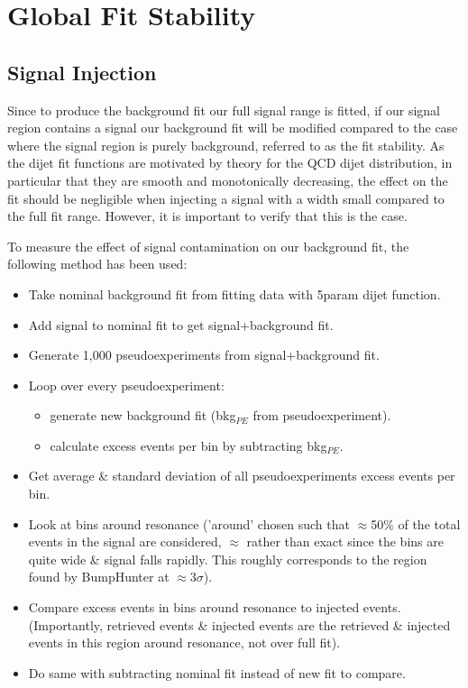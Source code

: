 \section{Global Fit Stability}
\subsection{Signal Injection}
Since to produce the background fit our full signal range is fitted, if our signal region contains a signal our background fit will be modified compared to the case where the signal region is purely background, referred to as the fit stability. As the dijet fit functions are motivated by theory for the QCD dijet distribution, in particular that they are smooth and monotonically decreasing, the effect on the fit should be negligible when injecting a signal with a width small compared to the full fit range. However, it is important to verify that this is the case.

To measure the effect of signal contamination on our background fit, the following method has been used:

\begin{itemize}
    \item Take nominal background fit from fitting data with 5param dijet function.
    \item Add signal to nominal fit to get signal+background fit.
    \item Generate 1,000 pseudoexperiments from signal+background fit.
    \item Loop over every pseudoexperiment:
    \begin{itemize}
        \item generate new background fit (bkg$_{PE}$ from pseudoexperiment).
        \item calculate excess events per bin by subtracting bkg$_{PE}$.
    \end{itemize}
    \item Get average \& standard deviation of all pseudoexperiments excess events per bin.
    \item Look at bins around resonance ('around' chosen such that $\approx$50\% of the total events in the signal are considered, $\approx$ rather than exact since the bins are quite wide \& signal falls rapidly. This roughly corresponds to the region found by BumpHunter at $\approx$3$\sigma$).
    \item Compare excess events in bins around resonance to injected events. (Importantly, retrieved events \& injected events are the retrieved \& injected events in this region around resonance, not over full fit).
    \item Do same with subtracting nominal fit instead of new fit to compare.
\end{itemize}

